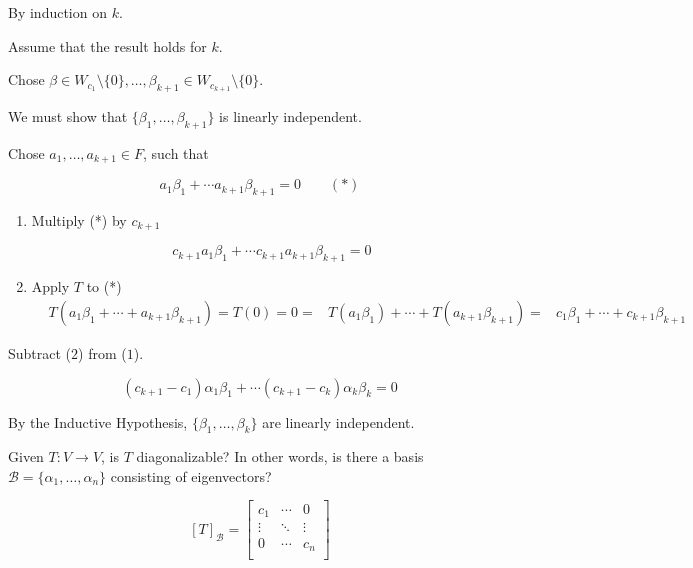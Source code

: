 \documentclass[12pt]{article}
\def\B{\mathcal B}
\begin{document}
  {
    By induction on $k$.

    {
      Assume that the result holds for $k$.
    }
    {
      Chose $\beta \in W_{c_1} \setminus \{0\}, \dots, \beta_{k + 1} \in W_{c_{k
      + 1}} \setminus \{0\}$.

      We must show that $\{\beta_1, \dots, \beta_{k + 1}\}$ is linearly
      independent.

      Chose $a_1, \dots, a_{k + 1} \in F$, such that

      \[
        a_1 \beta_1 + \cdots a_{k + 1} \beta_{k + 1} = 0 \,\,\,\,\,\,\,\,\,\,\,\,(*)
      \]

      \begin{enumerate}
        \item Multiply (*) by $c_{k + 1}$

          \[
            c_{k + 1} a_1 \beta_1 + \cdots c_{k + 1}  a_{k + 1} \beta_{k + 1} = 0
          \]

        \item Apply $T$ to (*)
          \begin{align*}
            &T(a_1 \beta_1 + \cdots + a_{k + 1} \beta_{k + 1}) = T(0) = 0
            =&T(a_1 \beta_1) + \cdots + T(a_{k + 1} \beta_{k + 1})
            =&c_1 \beta_1 + \cdots + c_{k + 1} \beta_{k + 1}
          \end{align*}
      \end{enumerate}

      Subtract ($2$) from ($1$).

      \[
        (c_{k + 1} - c_1) \alpha_1 \beta_1 + \cdots (c_{k + 1} - c_k) \alpha_k
        \beta_k = 0
      \]

      By the Inductive Hypothesis, $\{\beta_1, \dots, \beta_k\}$ are linearly
      independent.
    }
  }

  Given $T: V \to V$, is $T$ diagonalizable? In other words, is there a basis
  $\B = \{\alpha_1, \dots, \alpha_n\}$ consisting of eigenvectors?

  \[
    [T]_\B = \begin{bmatrix}
      c_1 & \cdots & 0 \\
      \vdots & \ddots & \vdots \\
      0 & \cdots & c_n \\
    \end{bmatrix}
  \]
\end{document}
